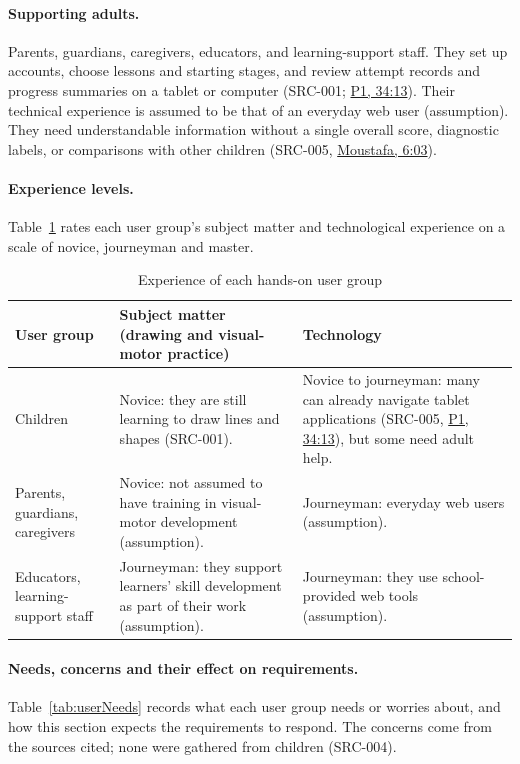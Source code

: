 \documentclass[12pt]{article}
\renewcommand{\_}{\textunderscore\allowbreak}%
\newcommand{\intlink}[3]{\hyperref[int:#1-#2]{#3}}
\newcommand{\intref}[2]{\intlink{#1}{#2}{#1, #2}}
\begin{document}
\paragraph{Supporting adults.} Parents, guardians, caregivers, educators, and
learning-support staff. They set up accounts, choose lessons and starting
stages, and review attempt records and progress summaries on a tablet or
computer (SRC-001; \intref{P1}{34:13}). Their technical experience is assumed to
be that of an everyday web user (assumption). They need understandable
information without a single overall score, diagnostic labels, or comparisons
with other children (SRC-005, \intref{Moustafa}{6:03}).

\paragraph{Experience levels.} Table~\ref{tab:userExperience} rates each user
group's subject matter and technological experience on a scale of novice,
journeyman and master.

\begin{table}[H]
\centering
\caption{Experience of each hands-on user group}
\label{tab:userExperience}
\begin{tabularx}{\textwidth}{>{\raggedright\arraybackslash}p{}
>{\raggedright\arraybackslash}X>{\raggedright\arraybackslash}X}
\toprule
\textbf{User group} & \textbf{Subject matter (drawing and visual-motor
practice)} & \textbf{Technology} \\
\midrule
Children & Novice: they are still learning to draw lines and shapes (SRC-001). &
Novice to journeyman: many can already navigate tablet applications (SRC-005,
\intref{P1}{34:13}), but some need adult help. \\
Parents, guardians, caregivers & Novice: not assumed to have training in
visual-motor development (assumption). & Journeyman: everyday web users
(assumption). \\
Educators, learning-support staff & Journeyman: they support learners' skill
development as part of their work (assumption). & Journeyman: they use
school-provided web tools (assumption). \\
\bottomrule
\end{tabularx}
\end{table}

\paragraph{Needs, concerns and their effect on requirements.}
Table~\ref{tab:userNeeds} records what each user group needs or worries about,
and how this section expects the requirements to respond. The concerns come from
the sources cited; none were gathered from children (SRC-004).
\end{document}
